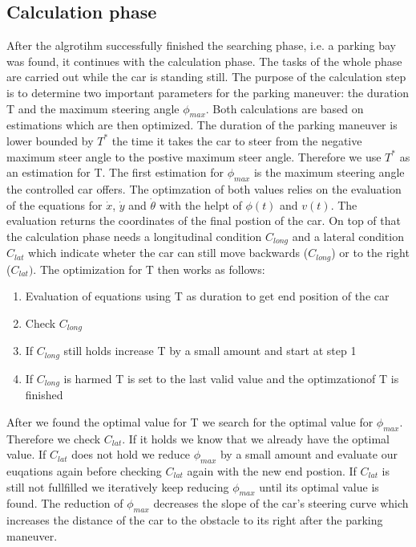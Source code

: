 \documentclass[paper=a4, fontsize=11pt]{scrreprt}
\begin{document}
\subsection{Calculation phase} \label{calculating}
After the algrotihm successfully finished the searching phase, i.e. a parking bay was found, it continues with the calculation phase. The tasks of the whole phase are carried out while the car is standing still. The purpose of the calculation step is to determine two important parameters for the parking maneuver: the duration T and the maximum steering angle $\phi_{max}$. Both calculations are based on estimations which are then optimized. The duration of the parking maneuver is lower bounded by $T^*$ the time it takes the car to steer from the negative maximum steer angle to the postive maximum steer angle. Therefore we use $T^*$ as an estimation for T. The first estimation for $\phi_{max}$ is the maximum steering angle the controlled car offers. The optimzation of both values relies on the evaluation of the equations for $\dot{x}$, $\dot{y}$ and $\dot{\theta}$ with the helpt of $\phi(t)$ and $v(t)$. The evaluation returns the coordinates of the final postion of the car. On top of that the calculation phase needs a longitudinal condition $C_{long}$ and a lateral condition $C_{lat}$ which indicate wheter the car can still move backwards ($C_{long}$) or to the right ($C_{lat})$. The optimization for T then works as follows:
\begin{enumerate}
	\item Evaluation of equations using T as duration to get end position of the car
	\item Check $C_{long}$
	\item If $C_{long}$ still holds increase T by a small amount and start at step 1
	\item If $C_{long}$ is harmed T is set to the last valid value and the optimzationof T is finished
\end{enumerate}
After we found the optimal value for T we search for the optimal value for $\phi_{max}$. Therefore we check $C_{lat}$. If it holds we know that we already have the optimal value. If $C_{lat}$ does not hold we reduce $\phi_{max}$ by a small amount and evaluate our euqations again before checking $C_{lat}$ again with the new end postion. If $C_{lat}$ is still not fullfilled we iteratively keep reducing $\phi_{max}$ until its optimal value is found. The reduction of $\phi_{max}$ decreases the slope of the car's steering curve which increases the distance of the car to the obstacle to its right after the parking maneuver.
\end{document}
